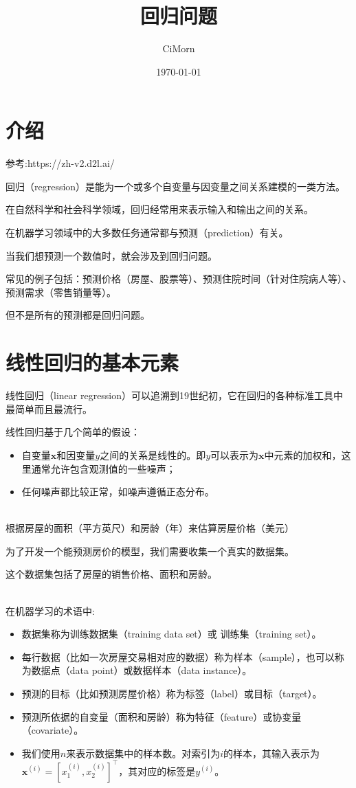 \documentclass[openany,11pt]{book}
\title{回归问题}
\author{CiMorn}
\date{\today}
\begin{document}
	
	\maketitle
\chapter{介绍}

参考:https://zh-v2.d2l.ai/

回归（regression）是能为一个或多个自变量与因变量之间关系建模的一类方法。

在自然科学和社会科学领域，回归经常用来表示输入和输出之间的关系。

在机器学习领域中的大多数任务通常都与预测（prediction）有关。

当我们想预测一个数值时，就会涉及到回归问题。

常见的例子包括：预测价格（房屋、股票等）、预测住院时间（针对住院病人等）、预测需求（零售销量等）。

但不是所有的预测都是回归问题。


\chapter{线性回归的基本元素}

线性回归（linear regression）可以追溯到19世纪初，它在回归的各种标准工具中最简单而且最流行。

线性回归基于几个简单的假设：

\begin{itemize}
	\item 自变量$\mathbf{x}$和因变量$y$之间的关系是线性的。即$y$可以表示为$\mathbf{x}$中元素的加权和，这里通常允许包含观测值的一些噪声；
	\item 任何噪声都比较正常，如噪声遵循正态分布。
\end{itemize}

~\\
{\color{red}根据房屋的面积（平方英尺）和房龄（年）来估算房屋价格（美元）}

为了开发一个能预测房价的模型，我们需要收集一个真实的数据集。

这个数据集包括了房屋的销售价格、面积和房龄。

~\\
在机器学习的术语中:
\begin{itemize}
	\item 数据集称为训练数据集（training data set）或 训练集（training set）。
	\item 每行数据（比如一次房屋交易相对应的数据）称为样本（sample），也可以称为数据点（data point）或数据样本（data instance）。
	\item 预测的目标（比如预测房屋价格）称为标签（label）或目标（target）。
	\item 预测所依据的自变量（面积和房龄）称为特征（feature）或协变量（covariate）。
	\item 我们使用$n$来表示数据集中的样本数。对索引为$i$的样本，其输入表示为$\mathbf{x}^{(i)} = [x_1^{(i)}, x_2^{(i)}]^\top$，其对应的标签是$y^{(i)}$。
\end{itemize}
\end{document}
